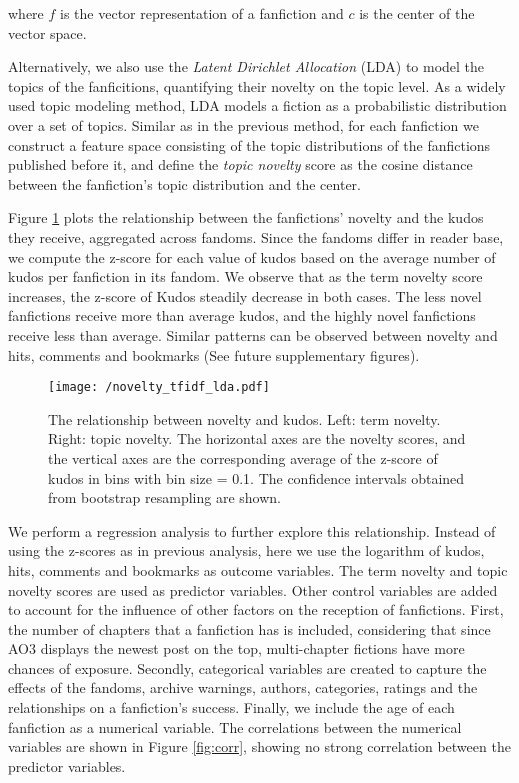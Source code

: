 \documentclass[a4paper]{article}
\begin{document}
where $f$ is the vector representation of a fanfiction and $c$ is the center of the vector space.

Alternatively, we also use the \emph{Latent Dirichlet Allocation} (LDA) \cite{blei2003latent} to model the topics of the fanficitions, quantifying their novelty on the topic level. As a widely used topic modeling method, LDA models a fiction as a probabilistic distribution over a set of topics. Similar as in the previous method, for each fanfiction we construct a feature space consisting of the topic distributions of the fanfictions published before it, and define the \emph{topic novelty} score as the cosine distance between the fanfiction's topic distribution and the center. 

Figure \ref{fig:tfidf_lda_kudos} plots the relationship between the fanfictions' novelty and the kudos they receive, aggregated across fandoms. Since the fandoms differ in reader base, we compute the z-score for each value of kudos based on the average number of kudos per fanfiction in its fandom. We observe that as the term novelty score increases, the z-score of Kudos steadily decrease in both cases. The less novel fanfictions receive more than average kudos, and the highly novel fanfictions receive less than average. Similar patterns can be observed between novelty and hits, comments and bookmarks (See future supplementary figures).

\begin{figure}
    \centering
          \texttt{[image: /novelty\_tfidf\_lda.pdf]}
        \caption{The relationship between novelty and kudos. Left: term novelty. Right: topic novelty. The horizontal axes are the novelty scores, and the vertical axes are the corresponding average of the z-score of kudos in bins with bin size = 0.1. The confidence intervals obtained from bootstrap resampling are shown. }
        \label{fig:tfidf_lda_kudos}
\end{figure}


We perform a regression analysis to further explore this relationship. Instead of using the z-scores as in previous analysis, here we use the logarithm of kudos, hits, comments and bookmarks as outcome variables. The term novelty and topic novelty scores are used as predictor variables. Other control variables are added to account for the influence of other factors on the reception of fanfictions. First, the number of chapters that a fanfiction has is included, considering that since AO3 displays the newest post on the top, multi-chapter fictions have more chances of exposure. Secondly, categorical variables are created to capture the effects of the fandoms, archive warnings, authors, categories, ratings and the relationships on a fanfiction's success. Finally, we include the age of each fanfiction as a numerical variable. The correlations between the numerical variables are shown in Figure \ref{fig:corr}, showing no strong correlation between the predictor variables.
\end{document}

